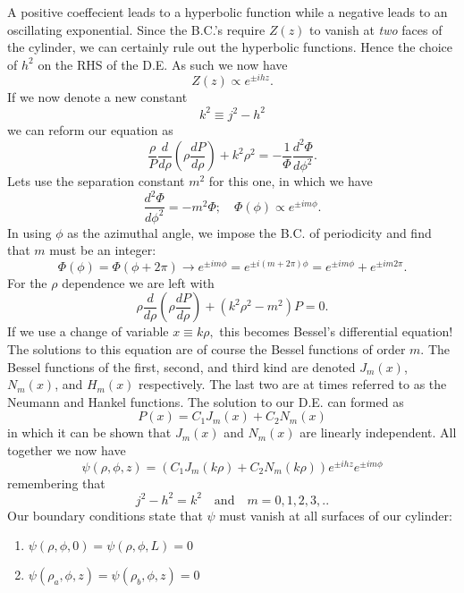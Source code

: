 \documentclass[11pt,letterpaper]{article}
\begin{document}
                A positive coeffecient leads to a hyperbolic function while a negative leads to an oscillating exponential. Since the B.C.'s require 
                $Z(z)$ to vanish at \emph{two} faces of the cylinder, we can certainly rule out the hyperbolic functions. Hence the choice of $h^2$ on 
                the RHS of the D.E. As such we now have
                \[
                		Z(z)\propto e^{\pm ihz}.
		\]
                If we now denote a new constant 
                \[
                		k^2\equiv j^2-h^2
		\]
                we can reform our equation as
                \[
                		\frac{\rho}{P}\frac{d}{d\rho}\left(\rho\frac{dP}{d\rho}\right)+k^2\rho^2 = -\frac{1}{\Phi}\frac{d^2\Phi}{d\phi^2}.
		\]
                Lets use the separation constant $m^2$ for this one, in which we have
                \[
                		\frac{d^2\Phi}{d\phi^2} = -m^2\Phi;\quad\Phi(\phi)\propto e^{\pm im\phi}.
		\]
                In using $\phi$ as the azimuthal angle, we impose the B.C. of periodicity and find that $m$ must be an integer:
                \[
                		\Phi(\phi) = \Phi(\phi+2\pi)\rightarrow e^{\pm im\phi}=e^{\pm i(m+2\pi)\phi} = e^{\pm im\phi}+e^{\pm im2\pi}.
		\]
                For the $\rho$ dependence we are left with 
                \begin{equation}\label{bde}\rho\frac{d}{d\rho}\left(\rho\frac{dP}{d\rho}\right)+(k^2\rho^2-m^2)P = 0.
                \end{equation}
                If we use a change of variable $x\equiv k\rho,$ this becomes Bessel's differential equation! The solutions to this equation are of 
                course the Bessel functions of order $m$. The Bessel functions of the first, second, and third kind are denoted $J_m(x)$, $N_m(x)$, 
                and $H_m(x)$ respectively. The last two are at times referred to as the Neumann and Hankel functions. The solution to our D.E. can 
                formed as 
                \[
                		P(x) = C_1J_m(x)+C_2N_m(x)
		\]
                in which it can be shown that $J_m(x)$ and $N_m(x)$ are linearly independent. All together we now have
                \[
                		\psi(\rho,\phi,z) = (C_1J_m(k\rho)+C_2N_m(k\rho))e^{\pm ihz}e^{\pm im\phi}
		\]
                remembering that
                \[
                		j^2-h^2 = k^2\quad\text{and}\quad m=0,1,2,3,..
		\]
                Our boundary conditions state that $\psi$ must vanish at all surfaces of our cylinder:
              	  \begin{enumerate}
               		 \item $\psi(\rho,\phi,0) = \psi(\rho,\phi,L) = 0$
              		  \item $\psi(\rho_a,\phi,z)=\psi(\rho_b,\phi,z) = 0$
              	  \end{enumerate}
\end{document}
